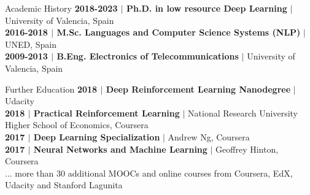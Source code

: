 \documentclass{resume} %
\begin{document}
\begin{rSection}{Academic History}
{\textbf{2018-2023 $|$ Ph.D. in low resource Deep Learning}  $|$  University of Valencia, Spain}
\\
{\textbf{2016-2018 $|$ M.Sc. Languages and Computer Science Systems (NLP)}  $|$  UNED, Spain}
\\
{\textbf{2009-2013 $|$ B.Eng. Electronics of Telecommunications}  $|$ University of Valencia, Spain}
\end{rSection}

\begin{rSection}{Further Education}
{\textbf{2018 $|$ Deep Reinforcement Learning Nanodegree}  $|$  Udacity}\\
{\textbf{2018 $|$ Practical Reinforcement Learning}  $|$  National Research University Higher School of Economics, Coursera} \\
{\textbf{2017 $|$ Deep Learning Specialization}  $|$  Andrew Ng, Coursera}\\
{\textbf{2017 $|$ Neural Networks and Machine Learning}  $|$  Geoffrey Hinton, Coursera}\\
{... more than 30 additional MOOCs and online courses from Coursera, EdX, Udacity and Stanford Lagunita}
\end{rSection}



\end{document}
